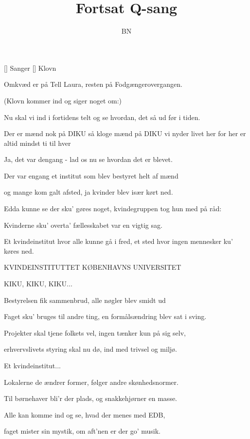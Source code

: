 \documentclass[a4paper,11pt]{article}
\title{Fortsat Q-sang}
\author{BN}
\begin{document}
\maketitle

\begin{roles}
[] Sanger
[] Klovn
\end{roles}

Omkvæd er på Tell Laura, resten på Fodgængerovergangen.

\begin{song}
  (Klovn kommer ind og siger noget om:)

 Nu skal vi ind i fortidens telt og se hvordan, det så ud før i tiden.

 Der er mænd nok på DIKU
så kloge mænd på DIKU
vi nyder livet her
for her er altid mindst ti til hver

 Ja, det var dengang - lad os nu se hvordan det er blevet.

 Der var engang et institut som blev bestyret helt af mænd

og mange kom galt afsted, ja kvinder blev især kørt ned.

Edda kunne se der sku' gøres noget, kvindegruppen tog hun med på råd:

Kvinderne sku' overta' fællesskabet var en vigtig sag.

 Et kvindeinstitut hvor alle kunne gå i fred,
et sted hvor ingen mennesker ku' køres ned.

 KVINDEINSTITUTTET KØBENHAVNS UNIVERSITET

 KIKU, KIKU, KIKU...

Bestyrelsen fik sammenbrud, alle nøgler blev smidt ud

Faget sku' bruges til andre ting, en formålsændring blev sat i sving.

Projekter skal tjene folkets vel, ingen tænker kun på sig selv,

erhvervslivets styring skal nu dø, ind med trivsel og miljø.

 Et kvindeinstitut...

Lokalerne de ændrer former, følger andre skønhedsnormer.

Til børnehaver bli'r der plads, og snakkehjørner en masse.

Alle kan komme ind og se, hvad der menes med EDB,

faget mister sin mystik, om aft'nen er der go' musik.


\end{song}
\end{document}
